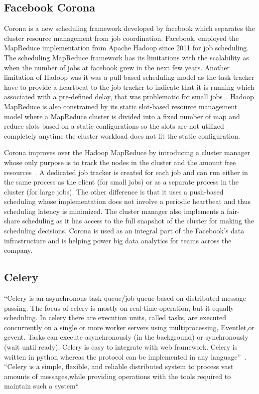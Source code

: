\subsection{Facebook Corona}

Corona is a new scheduling framework developed by facebook which
separates the cluster resource management from job coordination.
Facebook, employed the MapReduce implementation from Apache Hadoop
since 2011 for job scheduling. The scheduling MapReduce framework has
its limitations with the scalability as when the number of jobs at
facebook grew in the next few years. Another limitation of Hadoop was
it was a pull-based scheduling model as the task tracker have to
provide a heartbeat to the job tracker to indicate that it is running
which associated with a pre-defined delay, that was problematic for
small jobs~\cite{www-facebook-corona}. Hadoop MapReduce is also
constrained by its static slot-based resource management model where a
MapReduce cluster is divided into a fixed number of map and reduce
slots based on a static configurations so the slots are not utilized
completely anytime the cluster workload does not fit the static
configuration.

Corona improves over the Hadoop MapReduce by introducing a cluster
manager whose only purpose is to track the nodes in the cluster and
the amount free resources~\cite{www-facebook-corona}. A dedicated job
tracker is created for each job and can run either in the same process
as the client (for small jobs) or as a separate process in the cluster
(for large jobs). The other difference is that it uses a push-based
scheduling whose implementation does not involve a periodic heartbeat
and thus scheduling latency is minimized. The cluster manager also
implements a fair-share scheduling as it has access to the full
snapshot of the cluster for making the scheduling decisions. Corona is
used as an integral part of the Facebook's data infrastructure and is
helping power big data analytics for teams across the company.
     
\subsection{Celery}

``Celery is an asynchronous task queue/job queue based on distributed
message passing.  The focus of celery is mostly on real-time
operation, but it equally scheduling.  In celery there are execution
units, called tasks, are executed concurrently on a single or more
worker servers using multiprocessing, Eventlet,or gevent.  Tasks can
execute asynchronously (in the background) or synchronously (wait
until ready).  Celery is easy to integrate with web framework. Celery
is written in python whereas the protocol can be implemented in any
language''~\cite{celery}. ``Celery is a simple, flexible, and reliable
distributed system to process vast amounts of messages,while providing
operations with the tools required to maintain such a
system``\cite{celerydocs}.

